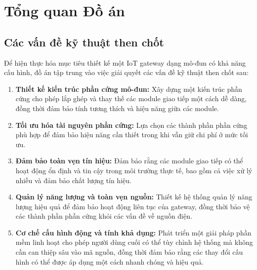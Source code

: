 \chapter{Tổng quan Đồ án}
    \section{Các vấn đề kỹ thuật then chốt}
        Để hiện thực hóa mục tiêu thiết kế một IoT gateway dạng mô-đun có khả năng cấu hình, đồ án tập trung vào việc giải quyết các vấn đề kỹ thuật then chốt sau:
        \begin{enumerate}
            \item \textbf{Thiết kế kiến trúc phần cứng mô-đun:} Xây dựng một kiến trúc phần cứng cho phép lắp ghép và thay thế các module giao tiếp một cách dễ dàng, đồng thời đảm bảo tính tương thích và hiệu năng giữa các module.
            \item \textbf{Tối ưu hóa tài nguyên phần cứng:} Lựa chọn các thành phần phần cứng phù hợp để đảm bảo hiệu năng cần thiết trong khi vẫn giữ chi phí ở mức tối ưu.
            \item \textbf{Đảm bảo toàn vẹn tín hiệu:} Đảm bảo rằng các module giao tiếp có thể hoạt động ổn định và tin cậy trong môi trường thực tế, bao gồm cả việc xử lý nhiễu và đảm bảo chất lượng tín hiệu.
            \item \textbf{Quản lý năng lượng và toàn vẹn nguồn:} Thiết kế hệ thống quản lý năng lượng hiệu quả để đảm bảo hoạt động liên tục của gateway, đồng thời bảo vệ các thành phần phần cứng khỏi các vấn đề về nguồn điện.
            \item \textbf{Cơ chế cấu hình động và tính khả dụng:} Phát triển một giải pháp phần mềm linh hoạt cho phép người dùng cuối có thể tùy chỉnh hệ thống mà không cần can thiệp sâu vào mã nguồn, đồng thời đảm bảo rằng các thay đổi cấu hình có thể được áp dụng một cách nhanh chóng và hiệu quả.   
        \end{enumerate}

    
        
